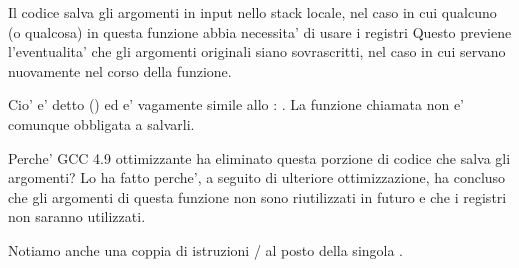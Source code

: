 Il codice salva gli argomenti in input nello stack locale, nel caso in cui qualcuno (o qualcosa) in questa funzione abbia necessita' 
di usare i registri  
Questo previene l'eventualita' che gli argomenti originali siano sovrascritti, nel caso in cui servano nuovamente nel corso della funzione.

Cio' e' detto  (\ARMPCS) ed e' vagamente simile allo : .
La funzione chiamata non e' comunque obbligata a salvarli.

Perche' GCC 4.9 ottimizzante ha eliminato questa porzione di codice che salva gli argomenti?
Lo ha fatto perche', a seguito di ulteriore ottimizzazione, ha concluso che gli argomenti di questa funzione non sono riutilizzati in futuro e
che i registri  non saranno utilizzati.


Notiamo anche una coppia di istruzioni / al posto della singola .
